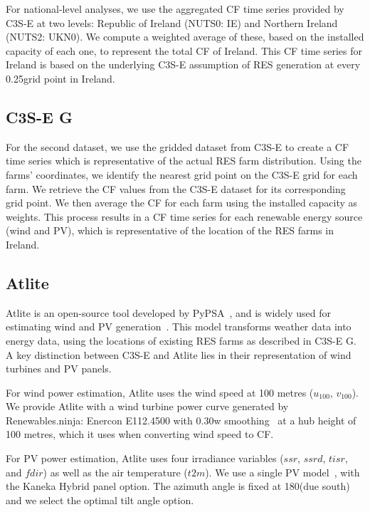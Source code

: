 \documentclass[a4paper, 11pt]{article}
\begin{document}
For national-level analyses, we use the aggregated CF time series provided by C3S-E at two levels: Republic of Ireland (NUTS0: IE) and Northern Ireland (NUTS2: UKN0). We compute a weighted average of these, based on the installed capacity of each one, to represent the total CF of Ireland. This CF time series for Ireland is based on the underlying C3S-E assumption of RES generation at every 0.25\textdegree grid point in Ireland.

\subsection{C3S-E G}
\label{sec:C3SEG}

For the second dataset, we use the gridded dataset from C3S-E to create a CF time series which is representative of the actual RES farm distribution. Using the farms' coordinates, we identify the nearest grid point on the C3S-E grid for each farm. We retrieve the CF values from the C3S-E dataset for its corresponding grid point. We then average the CF for each farm using the installed capacity as weights. This process results in a CF time series for each renewable energy source (wind and PV), which is representative of the location of the RES farms in Ireland. 

\subsection{Atlite} 
\label{sec:atlite}

Atlite is an open-source tool developed by PyPSA~\cite{hofman2021atlite}, and is widely used for estimating wind and PV generation~\cite{mockert2023drought, li2023atlite, parzen2023atlite, ali2023comparative}. This model transforms weather data into energy data, using the locations of existing RES farms as described in C3S-E G. A key distinction between C3S-E and Atlite lies in their representation of wind turbines and PV panels.

For wind power estimation, Atlite uses the wind speed at 100 metres ($u_{100}$, $v_{100}$). We provide Atlite with a wind turbine power curve generated by Renewables.ninja: Enercon E112.4500 with 0.30w smoothing~\cite{staffell2016wake} at a hub height of 100 metres, which it uses when converting wind speed to CF.

For PV power estimation, Atlite uses four irradiance variables ($ssr$, $ssrd$, $tisr$, and $fdir$) as well as the air temperature ($t2m$). We use a single PV model~\cite{beyer2004pv}, with the Kaneka Hybrid panel option. The azimuth angle is fixed at 180\textdegree (due south) and we select the optimal tilt angle option.
\end{document}
